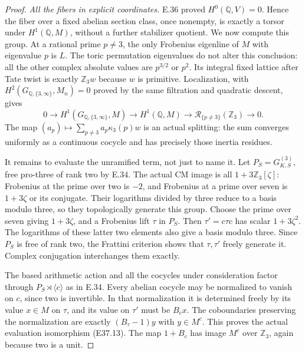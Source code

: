 \begin{proof}
\emph{All the fibers in explicit coordinates.}
E.36 proved $H^0(\mathbb Q,V)=0$. Hence the fiber over
a fixed abelian section class, once nonempty, is
exactly a torsor under $H^1(\mathbb Q,M)$, without a
further stabilizer quotient. We now compute this group.
At a rational prime $p\ne3$, the only Frobenius
eigenline of $M$ with eigenvalue $p$ is $L$.
The toric permutation eigenvalues do not alter this
conclusion: all the other complex absolute values
are $p^{3/2}$ or $p^2$. Its integral fixed lattice
after Tate twist is exactly $\mathbb Z_3w$ because
$w$ is primitive. Localization, with
$H^2(G_{\mathbb Q,\{3,\infty\}},M_n)=0$ proved by the
same filtration and quadratic descent, gives
\[
 0\to H^1(G_{\mathbb Q,\{3,\infty\}},M)
 \to H^1(\mathbb Q,M)
 \to\mathcal R_{\{p\ne3\}}(\mathbb Z_3)\to0.
 \tag{E37.20}
\]
The map $(a_p)\mapsto\sum_{p\ne3}a_p\kappa_3(p)w$
is an actual splitting: the sum converges uniformly
as a continuous cocycle and has precisely those
inertia residues.

It remains to evaluate the unramified term, not just
to name it. Let $P_S=G_{K,S}^{(3)}$, free pro-three of
rank two by E.34. The actual CM image is all
$1+3\mathbb Z_3[\zeta]$: Frobenius at the prime over
two is $-2$, and Frobenius at a prime over seven is
$1+3\zeta$ or its conjugate. Their logarithms divided
by three reduce to a basis modulo three, so they
topologically generate this group. Choose the prime
over seven giving $1+3\zeta$, and a Frobenius lift
$\tau$ in $P_S$. Then $\tau'=c\tau c$ has scalar
$1+3\zeta^2$. The logarithms of these latter two
elements also give a basis modulo three. Since
$P_S$ is free of rank two, the Frattini criterion
shows that $\tau,\tau'$ freely generate it.
Complex conjugation interchanges them exactly.

The based arithmetic action and all the cocycles
under consideration factor through
$P_S\rtimes\langle c\rangle$ as in E.34.
Every abelian cocycle may be normalized to vanish
on $c$, since two is invertible. In that normalization
it is determined freely by its value $x\in M$ on
$\tau$, and its value on $\tau'$ must be $B_cx$.
The coboundaries preserving the normalization are
exactly $(B_\tau-1)y$ with $y\in M^c$.
This proves the actual evaluation isomorphism
(E37.13). The map $1+B_c$ has image $M^c$ over
$\mathbb Z_3$, again because two is a unit.


\end{proof}
